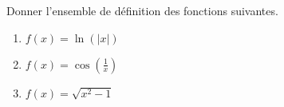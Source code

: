 
\begin{exercice}[\boringexo]\label{exorevisions-0002}

	Donner l'ensemble de définition des fonctions suivantes.
	\begin{enumerate}
		\item
			$f(x)=\ln(| x |)$
		\item
			$f(x)=\cos(\frac{1}{ x })$
		\item
			$f(x)=\sqrt{x^2-1}$
	\end{enumerate}

\end{exercice}
